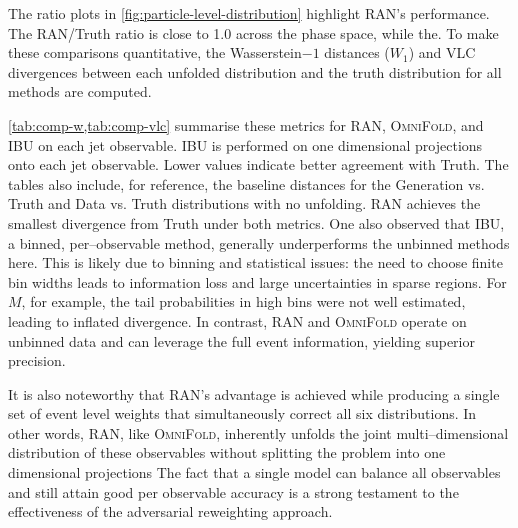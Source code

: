 {{            The ratio plots in \cref{fig:particle-level-distribution} highlight RAN’s performance. The RAN/Truth ratio is close to 1.0 across the phase space, while the.
            To make these comparisons quantitative, the Wasserstein\(-1\) distances ($W_1$) and VLC divergences between each unfolded distribution and the truth distribution for all methods are computed.


            \cref{tab:comp-w,tab:comp-vlc} summarise these metrics for RAN, \textsc{OmniFold}, and IBU on each jet observable.
            IBU is performed on one dimensional projections onto each jet observable.
            Lower values indicate better agreement with Truth.
            The tables also include, for reference, the baseline distances for the Generation vs. Truth and Data vs. Truth distributions with no unfolding.
            RAN achieves the smallest divergence from Truth under both metrics.
            One also observed that IBU, a binned, per--observable method, generally underperforms the unbinned methods here.
            This is likely due to binning and statistical issues: the need to choose finite bin widths leads to information loss and large uncertainties in sparse regions.
            For $M$, for example, the tail probabilities in high bins were not well estimated, leading to inflated divergence.
            In contrast, RAN and \textsc{OmniFold} operate on unbinned data and can leverage the full event information, yielding superior precision.
            
            It is also noteworthy that RAN’s advantage is achieved while producing a single set of event level weights that simultaneously correct all six distributions.
            In other words, RAN, like \textsc{OmniFold}, inherently unfolds the joint multi--dimensional distribution of these observables without splitting the problem into one dimensional projections
            The fact that a single model can balance all observables and still attain good per observable accuracy is a strong testament to the effectiveness of the adversarial reweighting approach.

}}
